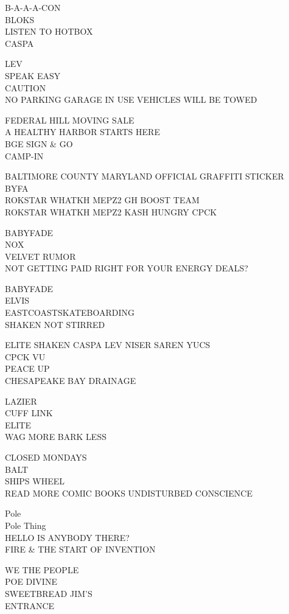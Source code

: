 \documentclass[10pt,letterpaper]{article}
\begin{document}
B{-}A{-}A{-}A{-}CON\\
BLOKS\\
LISTEN TO HOTBOX\\
CASPA

LEV\\
SPEAK EASY\\
CAUTION\\
NO PARKING GARAGE IN USE VEHICLES WILL BE TOWED

FEDERAL HILL MOVING SALE\\
A HEALTHY HARBOR STARTS HERE\\
BGE SIGN \& GO\\
CAMP{-}IN

BALTIMORE COUNTY MARYLAND OFFICIAL GRAFFITI STICKER\\
BYFA\\
ROKSTAR WHATKH MEPZ2 GH BOOST TEAM\\
ROKSTAR WHATKH MEPZ2 KASH HUNGRY CPCK

BABYFADE\\
NOX\\
VELVET RUMOR\\
NOT GETTING PAID RIGHT FOR YOUR ENERGY DEALS?

BABYFADE\\
ELVIS\\
EASTCOASTSKATEBOARDING\\
SHAKEN NOT STIRRED

ELITE SHAKEN CASPA LEV NISER SAREN YUCS\\
CPCK VU\\
PEACE UP\\
CHESAPEAKE BAY DRAINAGE

LAZIER\\
CUFF LINK\\
ELITE\\
WAG MORE BARK LESS

CLOSED MONDAYS\\
BALT\\
SHIPS WHEEL\\
READ MORE COMIC BOOKS UNDISTURBED CONSCIENCE

Pole\\
Pole Thing\\
HELLO IS ANYBODY THERE?\\
FIRE \& THE START OF INVENTION

WE THE PEOPLE\\
POE DIVINE\\
SWEETBREAD JIM'S\\
ENTRANCE
\end{document}
